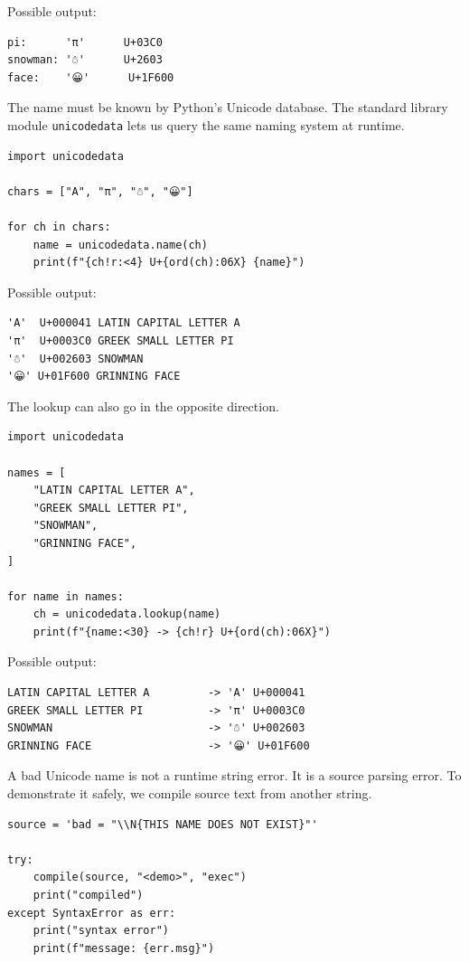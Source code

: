 Possible output:

\begin{verbatim}
pi:      'π'      U+03C0
snowman: '☃'      U+2603
face:    '😀'      U+1F600
\end{verbatim}

The name must be known by Python's Unicode database. The standard library module \texttt{unicodedata} lets us query the same naming system at runtime.

\begin{verbatim}
import unicodedata

chars = ["A", "π", "☃", "😀"]

for ch in chars:
    name = unicodedata.name(ch)
    print(f"{ch!r:<4} U+{ord(ch):06X} {name}")
\end{verbatim}

Possible output:

\begin{verbatim}
'A'  U+000041 LATIN CAPITAL LETTER A
'π'  U+0003C0 GREEK SMALL LETTER PI
'☃'  U+002603 SNOWMAN
'😀' U+01F600 GRINNING FACE
\end{verbatim}

The lookup can also go in the opposite direction.

\begin{verbatim}
import unicodedata

names = [
    "LATIN CAPITAL LETTER A",
    "GREEK SMALL LETTER PI",
    "SNOWMAN",
    "GRINNING FACE",
]

for name in names:
    ch = unicodedata.lookup(name)
    print(f"{name:<30} -> {ch!r} U+{ord(ch):06X}")
\end{verbatim}

Possible output:

\begin{verbatim}
LATIN CAPITAL LETTER A         -> 'A' U+000041
GREEK SMALL LETTER PI          -> 'π' U+0003C0
SNOWMAN                        -> '☃' U+002603
GRINNING FACE                  -> '😀' U+01F600
\end{verbatim}

A bad Unicode name is not a runtime string error. It is a source parsing error. To demonstrate it safely, we compile source text from another string.

\begin{verbatim}
source = 'bad = "\\N{THIS NAME DOES NOT EXIST}"'

try:
    compile(source, "<demo>", "exec")
    print("compiled")
except SyntaxError as err:
    print("syntax error")
    print(f"message: {err.msg}")
\end{verbatim}

